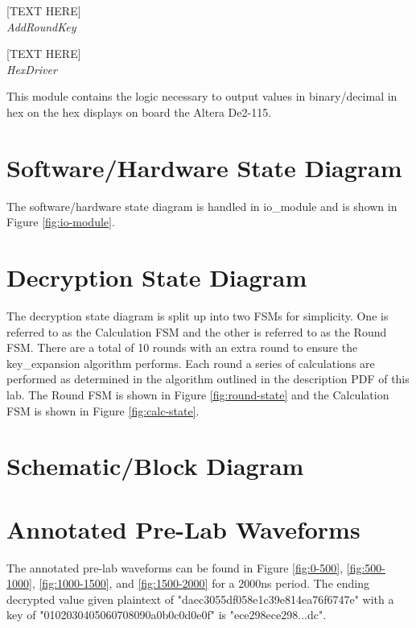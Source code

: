 \documentclass[journal, twocolumn, final,11pt,letterpaper]{IEEEtran}
\begin{document}
[TEXT HERE]\\

\textit{AddRoundKey}\\
\vspace{-4mm}

[TEXT HERE]\\

\textit{HexDriver}\\
\vspace{-4mm}

This module contains the logic necessary to output values in binary/decimal in hex on the hex displays on board the Altera De2-115.\\


\section{Software/Hardware State Diagram}
The software/hardware state diagram is handled in io\_module and is shown in Figure \ref{fig:io-module}.

\section{Decryption State Diagram}
The decryption state diagram is split up into two FSMs for simplicity. One is referred to as the Calculation FSM and the other is referred to as the Round FSM. There are a total of 10 rounds with an extra round to ensure the key\_expansion algorithm performs. Each round a series of calculations are performed as determined in the algorithm outlined in the description PDF of this lab. The Round FSM is shown in Figure \ref{fig:round-state} and the Calculation FSM is shown in Figure \ref{fig:calc-state}.

\section{Schematic/Block Diagram}

\section{Annotated Pre-Lab Waveforms}
The annotated pre-lab waveforms can be found in Figure \ref{fig:0-500}, \ref{fig:500-1000}, \ref{fig:1000-1500}, and \ref{fig:1500-2000} for a 2000ns period. The ending decrypted value given plaintext of "daec3055df058e1c39e814ea76f6747e" with a key of "0102030405060708090a0b0c0d0e0f" is "ece298ece298...dc".
\end{document}
